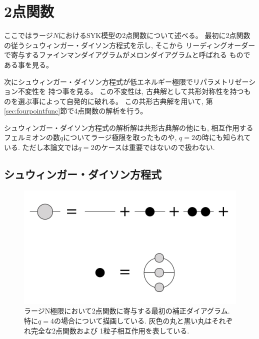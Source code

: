 \section{2点関数\label{sec:twopointfunc}}
ここではラージ$N$におけるSYK模型の2点関数について述べる。
最初に2点関数の従うシュウィンガー・ダイソン方程式を示し, そこから
リーディングオーダーで寄与するファインマンダイアグラムがメロンダイアグラムと呼ばれる
ものである事を見る。

次にシュウィンガー・ダイソン方程式が低エネルギー極限でリパラメトリゼーション不変性を
持つ事を見る。
この不変性は, 古典解として共形対称性を持つものを選ぶ事によって自発的に破れる。
この共形古典解を用いて, 第\ref{sec:fourpointfunc}節で4点関数の解析を行う。

シュウィンガー・ダイソン方程式の解析解は共形古典解の他にも, 
相互作用するフェルミオンの数$q$についてラージ極限を取ったものや, $q=2$の時にも知られている. 
ただし本論文では$q=2$のケースは重要ではないので扱わない. 

\subsection{シュウィンガー・ダイソン方程式}
\begin{figure}[ht]
  \centering
  \includegraphics[width=14cm]{figures/melonDiagram}
  \caption{ラージN極限において2点関数に寄与する最初の補正ダイアグラム.
  特に$q=4$の場合について描画している. 灰色の丸と黒い丸はそれぞれ完全な2点関数および
  1粒子相互作用を表している.}
  \label{fig:melonDiagram}
\end{figure}

